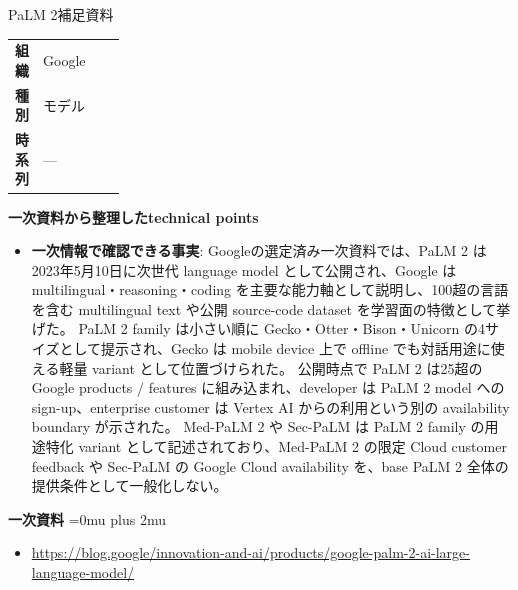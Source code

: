 \begin{technicalnote}{PaLM 2}{補足資料}
\begingroup
\begin{tabularx}{\linewidth}{@{}>{\bfseries}p{0.22\linewidth}X@{}}
組織 & Google \\
種別 & モデル \\
時系列 & — \\
\end{tabularx}
\smallskip
{\bfseries 一次資料から整理したtechnical points}
\begin{itemize}[leftmargin=1.5em,itemsep=0.35em]
\item \textbf{一次情報で確認できる事実}: Googleの選定済み一次資料では、PaLM 2 は2023年5月10日に次世代 language model として公開され、Google は multilingual・reasoning・coding を主要な能力軸として説明し、100超の言語を含む multilingual text や公開 source-code dataset を学習面の特徴として挙げた。 PaLM 2 family は小さい順に Gecko・Otter・Bison・Unicorn の4サイズとして提示され、Gecko は mobile device 上で offline でも対話用途に使える軽量 variant として位置づけられた。 公開時点で PaLM 2 は25超の Google products / features に組み込まれ、developer は PaLM 2 model への sign-up、enterprise customer は Vertex AI からの利用という別の availability boundary が示された。 Med-PaLM 2 や Sec-PaLM は PaLM 2 family の用途特化 variant として記述されており、Med-PaLM 2 の限定 Cloud customer feedback や Sec-PaLM の Google Cloud availability を、base PaLM 2 全体の提供条件として一般化しない。
\end{itemize}
\begin{minipage}{\linewidth}
\begin{samepage}
{\bfseries 一次資料}
\begingroup\sloppy
\Urlmuskip=0mu plus 2mu\relax
\begin{itemize}[leftmargin=1.5em,itemsep=0.25em]
\item {\scriptsize\url{https://blog.google/innovation-and-ai/products/google-palm-2-ai-large-language-model/}}
\end{itemize}
\endgroup
\end{samepage}
\end{minipage}
\endgroup
\end{technicalnote}
\medskip

